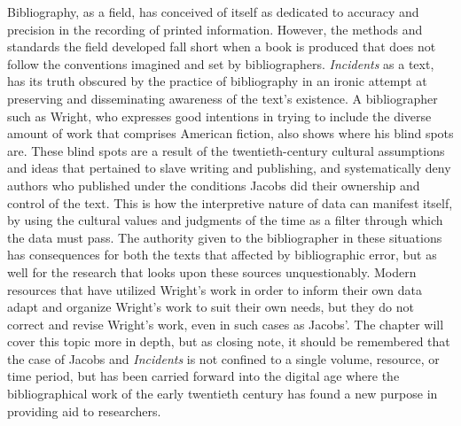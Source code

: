 Bibliography, as a field, has conceived of itself as dedicated to accuracy and precision in the recording of printed information. However, the methods and standards the field developed fall short when a book is produced that does not follow the conventions imagined and set by bibliographers. \textit{Incidents} as a text, has its truth obscured by the practice of bibliography in an ironic attempt at preserving and disseminating awareness of the text's existence. A bibliographer such as Wright, who expresses good intentions in trying to include the diverse amount of work that comprises American fiction, also shows where his blind spots are. These blind spots are a result of the twentieth-century cultural assumptions and ideas that pertained to slave writing and publishing, and systematically deny authors who published under the conditions Jacobs did their ownership and control of the text. This is how the interpretive nature of data can manifest itself, by using the cultural values and judgments of the time as a filter through which the data must pass. The authority given to the bibliographer in these situations has consequences for both the texts that affected by bibliographic error, but as well for the research that looks upon these sources unquestionably. Modern resources that have utilized Wright's work in order to inform their own data adapt and organize Wright's work to suit their own needs, but they do not correct and revise Wright's work, even in such cases as Jacobs'. The chapter will cover this topic more in depth, but as closing note, it should be remembered that the case of Jacobs and \textit{Incidents} is not confined to a single volume, resource, or time period, but has been carried forward into the digital age where the bibliographical work of the early twentieth century has found a new purpose in providing aid to researchers. 